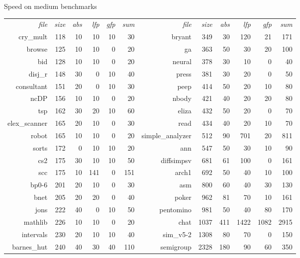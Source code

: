 \documentclass{beamer}
\begin{document}
\begin{frame}{Speed on medium benchmarks}
\vspace{\fill}

{\footnotesize
\begin{tabular}{@{}r|@{}r|@{\,\,}r@{\,\,}r@{\,\,}r@{\,\,}r@{\,\,}r|@{}r|@{\,\,}r@{\,\,}r@{\,\,}r@{\,\,}r@{}}
{\it file} & {\it size} & {\it abs} & {\it lfp} & {\it gfp} & {\it
sum} &
{\it file} & {\it size} & {\it abs} & {\it lfp} & {\it gfp} & {\it sum} \\
\cline{1-12}
%
cry\_mult&118&10&10&10&30 &
bryant&349&30&120&21&171\\
browse&125&10&10&0&20 &
ga&363&50&30&20&100\\
bid&128&10&10&0&20 &
neural&378&30&10&0&40\\

disj\_r&148&30&0&10&40 &
press&381&30&20&0&50\\
consultant&151&20&0&10&30 &
peep&414&50&20&10&80\\
ncDP&156&10&10&0&20 &
nbody&421&40&20&20&80\\
tsp&162&30&20&10&60 &
eliza&432&50&20&0&70\\
elex\_scanner&165&20&10&0&30 &
read&434&40&20&10&70\\

robot&165&10&10&0&20 &
simple\_analyzer&512&90&701&20&811\\
sorts&172&0&10&10&20 &
ann&547&50&30&10&90\\
cs2&175&30&10&10&50 &
diffsimpsv&681&61&100&0&161\\
scc&175&10&141&0&151 &
arch1&692&50&40&10&100\\
bp0-6&201&20&10&0&30 &
asm&800&60&40&30&130\\

bnet&205&20&20&0&40 &
poker&962&81&70&10&161\\
jons&222&40&0&10&50 &
pentomino&981&50&40&80&170\\
mathlib&226&10&10&0&20 &
chat&1037&411&1422&1082&2915\\
intervals&230&20&10&10&40 &
sim\_v5-2&1308&80&70&0&150\\
barnes\_hut&240&40&30&40&110 & semigroup&2328&180&90&60&350
\end{tabular}}


\vspace{\fill}
\end{frame}
\end{document}
